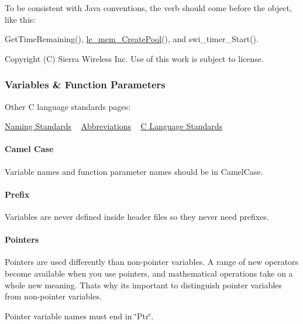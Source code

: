 To be consistent with Java conventions, the verb should come before the object, like this\+:


\begin{DoxyCode}
GetTimeRemaining(), \hyperlink{le__mem_8h_ab91efaa2978c9c1c7b2427d25b33241c}{le\_mem\_CreatePool}(), and swi\_timer\_Start().
\end{DoxyCode}






Copyright (C) Sierra Wireless Inc. Use of this work is subject to license. \hypertarget{ccodingStdsParam}{}\subsubsection{Variables \& Function Parameters}\label{ccodingStdsParam}
Other C language standards\textquotesingle{} pages\+:

\hyperlink{ccodingStdsNaming}{Naming Standards} ~\newline
 \hyperlink{ccodingStdsAbbr}{Abbreviations} ~\newline
 \hyperlink{ccodingStdsMain}{C Language Standards}\hypertarget{ccoding_stds_param_cstdsparamCamelCase}{}\paragraph{Camel Case}\label{ccoding_stds_param_cstdsparamCamelCase}
Variable names and function parameter names should be in Camel\+Case.\hypertarget{ccoding_stds_param_cstdsparamPrefix}{}\paragraph{Prefix}\label{ccoding_stds_param_cstdsparamPrefix}
Variables are never defined inside header files so they never need prefixes.\hypertarget{ccoding_stds_param_cstdsparamPointers}{}\paragraph{Pointers}\label{ccoding_stds_param_cstdsparamPointers}
Pointers are used differently than non-\/pointer variables. A range of new operators become available when you use pointers, and mathematical operations take on a whole new meaning. That\textquotesingle{}s why it\textquotesingle{}s important to distinguish pointer variables from non-\/pointer variables.

Pointer variable names must end in \char`\"{}\+Ptr\char`\"{}.


